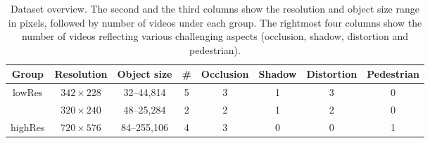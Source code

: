 \begin{table}
\footnotesize
\centering
\caption{Dataset overview. The second and the third columns show the resolution and object size range in pixels, followed by number of videos under each group. The rightmost four columns show the number of videos reflecting various challenging aspects (occlusion, shadow, distortion and pedestrian).}
\begin{tabular}{|c|c||c||c|c|c|c|c|}
    \hline
    Group & Resolution & Object size & \# & Occlusion & Shadow & Distortion & Pedestrian \\ \hline   
    \multirow{2}{*}{lowRes} & $342\times228$ & 32--44,814 & 5 & 3 & 1 & 3 & 0 \\ \cline{2-8}    
    ~                       & $320\times240$ & 48--25,284 & 2 & 2 & 1 & 2 & 0 \\ \hline
    highRes                 & $720\times576$ & 84--255,106 & 4 & 3 & 0 & 0 & 1 \\ \hline
\end{tabular}
\label{table:videos}
\end{table}
